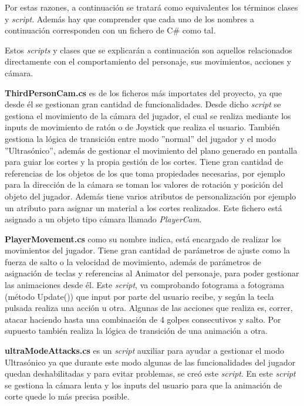 Por estas razones, a continuación se tratará  como equivalentes los términos clases y \textit{script}. Además hay que comprender que cada uno de los nombres a continuación corresponden con un fichero de C\# como tal.

Estos \textit{scripts} y clases que se explicarán a continuación son aquellos relacionados directamente con el comportamiento del personaje, sus movimientos, acciones y cámara.

\textbf{ThirdPersonCam.cs} es de los ficheros más importates del proyecto, ya que desde él se gestionan gran cantidad de funcionalidades. Desde dicho \textit{script} se gestiona el movimiento de la cámara del jugador, el cual se realiza mediante los inputs de movimiento de ratón o de Joystick que realiza el usuario. También gestiona la lógica de transición entre modo ''normal'' del jugador y el modo ''Ultrasónico'', además de gestionar el movimiento del plano generado en pantalla para guiar los cortes y la propia gestión de los cortes. Tiene gran cantidad de referencias de los objetos de los que toma propiedades necesarias, por ejemplo para la dirección de la cámara se toman los valores de rotación y posición del objeto del jugador. Además tiene varios atributos de personalización por ejemplo un atributo para asignar un material a los cortes realizados. Este fichero está asignado a un objeto tipo cámara llamado \textit{PlayerCam}.

\textbf{PlayerMovement.cs} como su nombre indica, está encargado de realizar los movimientos del jugador. Tiene gran cantidad de parámetros de ajuste como la fuerza de salto o la velocidad de movimiento, además de parámetros de asignación de teclas y referencias al Animator del personaje, para poder gestionar las animaciones desde él. Este \textit{script}, va comprobando fotograma a fotograma (método Update()) que input por parte del usuario recibe, y según la tecla pulsada realiza una acción u otra. Algunas de las acciones que realiza es, correr, atacar haciendo hasta una combinación de 4 golpes consecutivos y salto. Por supuesto también realiza la lógica de transición de una animación a otra.

\textbf{ultraModeAttacks.cs} es un \textit{script} auxiliar para ayudar a gestionar el modo Ultrasónico ya que durante este modo algunas de las funcionalidades del jugador quedan deshabilitadas y para evitar problemas, se creó este \textit{script}. En este \textit{script} se gestiona la cámara lenta y los inputs del usuario para que la animación de corte quede lo más precisa posible.

